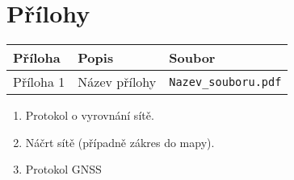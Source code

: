\section{Přílohy}
\begin{tabular}{lll}
  \textbf{Příloha} & \textbf{Popis} & \textbf{Soubor} \\
  \hline
  Příloha 1 & Název přílohy & \texttt{Nazev\_souboru.pdf} \\
\end{tabular}


\begin{enumerate}
    \item Protokol o vyrovnání sítě.
    \item Náčrt sítě (případně zákres do mapy).
    \item Protokol GNSS
\end{enumerate}


